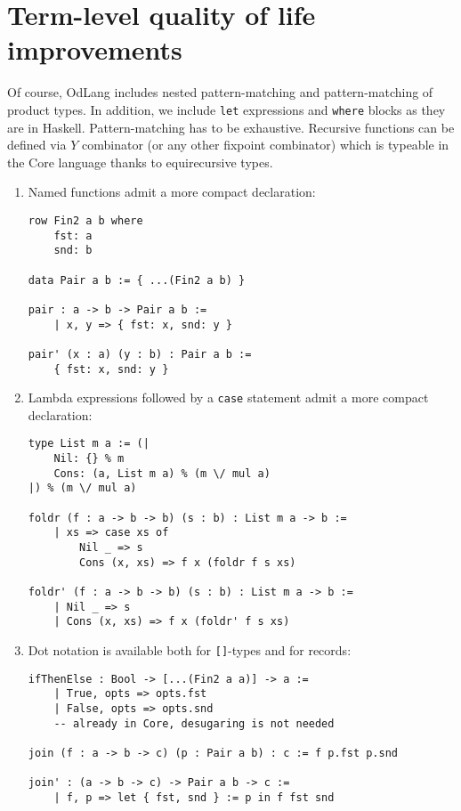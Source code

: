 \documentclass[a4paper,14pt]{extreport}
\begin{document}
\section{Term-level quality of life improvements}

Of course, OdLang includes nested pattern-matching and pattern-matching of
product types. In addition, we include \verb|let| expressions and \verb|where|
blocks as they are in Haskell. Pattern-matching has to be exhaustive. Recursive
functions can be defined via $Y$ combinator (or any other fixpoint combinator)
which is typeable in the Core language thanks to equirecursive types.

\begin{enumerate}
    \item Named functions admit a more compact declaration:
\begin{verbatim}
row Fin2 a b where
    fst: a
    snd: b

data Pair a b := { ...(Fin2 a b) }

pair : a -> b -> Pair a b :=
    | x, y => { fst: x, snd: y }

pair' (x : a) (y : b) : Pair a b :=
    { fst: x, snd: y }
\end{verbatim}
    \item Lambda expressions followed by a \verb|case| statement admit a more
        compact declaration:
\begin{verbatim}
type List m a := (|
    Nil: {} % m
    Cons: (a, List m a) % (m \/ mul a)
|) % (m \/ mul a)

foldr (f : a -> b -> b) (s : b) : List m a -> b :=
    | xs => case xs of
        Nil _ => s
        Cons (x, xs) => f x (foldr f s xs)

foldr' (f : a -> b -> b) (s : b) : List m a -> b :=
    | Nil _ => s
    | Cons (x, xs) => f x (foldr' f s xs)
\end{verbatim}
    \item Dot notation is available both for \verb|[]|-types and for records:
\begin{verbatim}
ifThenElse : Bool -> [...(Fin2 a a)] -> a :=
    | True, opts => opts.fst
    | False, opts => opts.snd
    -- already in Core, desugaring is not needed

join (f : a -> b -> c) (p : Pair a b) : c := f p.fst p.snd

join' : (a -> b -> c) -> Pair a b -> c :=
    | f, p => let { fst, snd } := p in f fst snd
\end{verbatim}
\end{enumerate}
\end{document}
